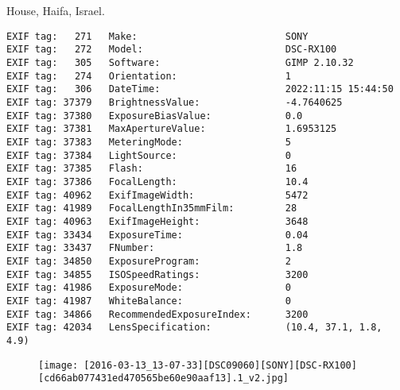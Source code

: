 \section{\protect{}}
\noindent House, Haifa, Israel.
\noindent
\begin{lstlisting}
EXIF tag:   271   Make:                          SONY
EXIF tag:   272   Model:                         DSC-RX100
EXIF tag:   305   Software:                      GIMP 2.10.32
EXIF tag:   274   Orientation:                   1
EXIF tag:   306   DateTime:                      2022:11:15 15:44:50
EXIF tag: 37379   BrightnessValue:               -4.7640625
EXIF tag: 37380   ExposureBiasValue:             0.0
EXIF tag: 37381   MaxApertureValue:              1.6953125
EXIF tag: 37383   MeteringMode:                  5
EXIF tag: 37384   LightSource:                   0
EXIF tag: 37385   Flash:                         16
EXIF tag: 37386   FocalLength:                   10.4
EXIF tag: 40962   ExifImageWidth:                5472
EXIF tag: 41989   FocalLengthIn35mmFilm:         28
EXIF tag: 40963   ExifImageHeight:               3648
EXIF tag: 33434   ExposureTime:                  0.04
EXIF tag: 33437   FNumber:                       1.8
EXIF tag: 34850   ExposureProgram:               2
EXIF tag: 34855   ISOSpeedRatings:               3200
EXIF tag: 41986   ExposureMode:                  0
EXIF tag: 41987   WhiteBalance:                  0
EXIF tag: 34866   RecommendedExposureIndex:      3200
EXIF tag: 42034   LensSpecification:             (10.4, 37.1, 1.8, 4.9)

\end{lstlisting}
\clearpage
\begin{figure}
\raggedleft
\texttt{[image: [2016-03-13\_13-07-33][DSC09060][SONY][DSC-RX100][cd66ab077431ed470565be60e90aaf13].1\_v2.jpg]}
\end{figure}


\clearpage
